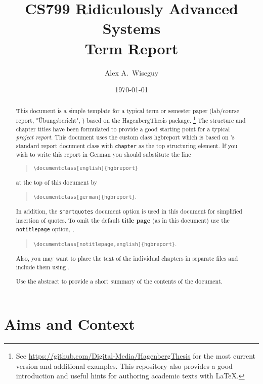 \documentclass[notitlepage,english,smartquotes]{hgbreport}
\author{Alex A.\ Wiseguy}										%
\title{CS799 Ridiculously Advanced Systems\\	%
			Term Report}	%
\date{\today}
\begin{document}

\maketitle

\begin{abstract}\noindent
This document is a simple template for a typical term or semester paper (lab/course report, 
"Übungsbericht", \etc) based on the \textsf{HagenbergThesis} \latex package.%
\footnote{See \url{https://github.com/Digital-Media/HagenbergThesis} for the most current version
and additional examples.
This repository also provides a good introduction and useful hints for authoring academic texts with LaTeX.}
The structure and chapter titles have been formulated to provide a good starting point
for a typical \emph{project report}.
This document uses the custom class \textsf{hgbreport} which is based on \latex's standard \textsf{report} 
document class with \texttt{chapter} as the top structuring element. 
If you wish to write this report in German you should substitute the line
\begin{quote}
	\verb!\documentclass[english]{hgbreport}! 
\end{quote}
at the top of this document by
\begin{quote}
	\verb!\documentclass[german]{hgbreport}!.
\end{quote}
In addition, the \texttt{smartquotes} document option is used in this document for simplified insertion of quotes.
To omit the default \textbf{title page} (as in this document) use the \texttt{notitlepage} option, \eg,
\begin{quote}
	\verb!\documentclass[notitlepage,english]{hgbreport}!.
\end{quote}
Also, you may want to place the text of the individual chapters in separate files and 
include them using \verb!!.

\bigskip
\noindent
Use the abstract to provide a short summary of the contents of the document.
\end{abstract}


\tableofcontents



\chapter{Aims and Context}
\end{document}
